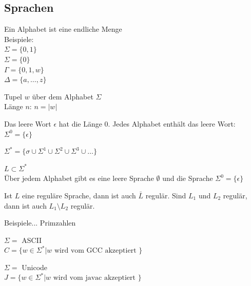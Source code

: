 \documentclass[a4paper]{article}
\begin{document}
\subsection{Sprachen}
	\begin{multicols}{2}	
	
	\begin{fdef}[Alphabet]
	Ein Alphabet ist eine endliche Menge \\
	Beispiele: \\
	$\Sigma = \{ 0,1 \}$ \\
	$\Sigma = \{ 0 \}$ \\
	$\Gamma = \{ 0,1,w \}$ \\
	$\Delta = \{ a, \dots, z \}$ \\
	\end{fdef}
	\begin{fdef}[Wort]
		Tupel $w$ über dem Alphabet $\Sigma$ \\
		Länge $n$: $n = |w|$
	\end{fdef}
	\begin{fdef}
		Das leere Wort $\epsilon$ hat die Länge 0.
		Jedes Alphabet enthält das leere Wort: $\Sigma^0 = \{\epsilon \}$
	\end{fdef}
	\begin{fdef}
		$\Sigma^* = \{ \sigma \cup \Sigma^1 \cup \Sigma^2 \cup \Sigma^3 \cup \dots \}$
	\end{fdef}
	\begin{fdef}[Sprache $L$]
		$L \subset \Sigma^*$ \\
		Über jedem Alphabet gibt es eine leere Sprache $\emptyset$ und die Sprache $\Sigma^0 = \{\epsilon \}$
	\end{fdef}
	\begin{fdef}[Mengenoperationen]
		Ist $L$ eine reguläre Sprache, dann ist auch $\bar L$ regulär.
		Sind $L_1$ und $L_2$ regulär, dann ist auch $L_1\setminus L_2$
		regulär.
	\end{fdef}
	
	Beispiele... Primzahlen
	
	\begin{fmerke}[C-Standard]
		$\Sigma = $ ASCII \\
		$C = \{w \in \Sigma^* | w \text{ wird vom GCC akzeptiert } \}$
	\end{fmerke}
	\begin{fmerke}[Java]
		$\Sigma = $ Unicode \\
		$J = \{w \in \Sigma^* | w \text{ wird vom javac akzeptiert } \}$
	\end{fmerke}

	\end{multicols}
	
\end{document}
